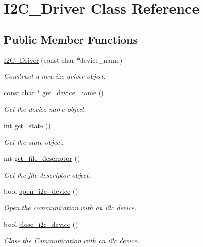 \hypertarget{class_i2_c___driver}{}\section{I2\+C\+\_\+\+Driver Class Reference}
\label{class_i2_c___driver}
\subsection*{Public Member Functions}
\begin{DoxyCompactItemize}
\item 
\hyperlink{class_i2_c___driver_a3e382db3517edc75227f540c872f93c8}{I2\+C\+\_\+\+Driver} (const char $\ast$device\+\_\+name)
\begin{DoxyCompactList}\small\item\em Construct a new i2c driver object. \end{DoxyCompactList}\item 
const char $\ast$ \hyperlink{class_i2_c___driver_a9c1be344012ed2b3f808c32fc2cc4eb8}{get\+\_\+device\+\_\+name} ()
\begin{DoxyCompactList}\small\item\em Get the device name object. \end{DoxyCompactList}\item 
int \hyperlink{class_i2_c___driver_acb63f4cd021237147ee12d264bd34231}{get\+\_\+state} ()
\begin{DoxyCompactList}\small\item\em Get the state object. \end{DoxyCompactList}\item 
int \hyperlink{class_i2_c___driver_a5c39bcab377ef93cba25f5a3793fbbd5}{get\+\_\+file\+\_\+descriptor} ()
\begin{DoxyCompactList}\small\item\em Get the file descriptor object. \end{DoxyCompactList}\item 
bool \hyperlink{class_i2_c___driver_a83291e51d4b09295b4e9562a01f80a2b}{open\+\_\+i2c\+\_\+device} ()
\begin{DoxyCompactList}\small\item\em Open the communication with an i2c device. \end{DoxyCompactList}\item 
bool \hyperlink{class_i2_c___driver_a6c9c95df6e1d6bbe7feee6eb506202ed}{close\+\_\+i2c\+\_\+device} ()
\begin{DoxyCompactList}\small\item\em Close the Communication with an i2c device. \end{DoxyCompactList}\item 

\end{DoxyCompactItemize}
